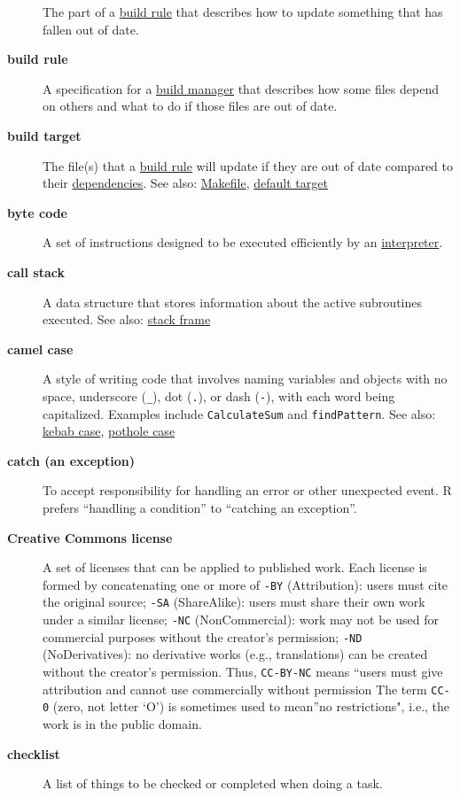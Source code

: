 \documentclass[
]{krantz}
\begin{document}
\begin{description}
The part of a \protect\hyperlink{build_rule}{build rule} that describes how to update something that has fallen out of date.
\item[\textbf{build rule}]
A specification for a \protect\hyperlink{build_manager}{build manager} that describes how some files depend on others and what to do if those files are out of date.
\item[\textbf{build target}]
The file(s) that a \protect\hyperlink{build_rule}{build rule} will update if they are out of date compared to their \protect\hyperlink{dependency}{dependencies}. See also: \protect\hyperlink{makefile}{Makefile}, \protect\hyperlink{default_target}{default target}
\item[\textbf{byte code}]
A set of instructions designed to be executed efficiently by an \protect\hyperlink{interpreter}{interpreter}.
\item[\textbf{call stack}]
A data structure that stores information about the active subroutines executed. See also: \protect\hyperlink{stack_frame}{stack frame}
\item[\textbf{camel case}]
A style of writing code that involves naming variables and objects with no space, underscore (\texttt{\_}), dot (\texttt{.}), or dash (\texttt{-}), with each word being capitalized. Examples include \texttt{CalculateSum} and \texttt{findPattern}. See also: \protect\hyperlink{kebab_case}{kebab case}, \protect\hyperlink{pothole_case}{pothole case}
\item[\textbf{catch (an exception)}]
To accept responsibility for handling an error or other unexpected event. R prefers ``handling a condition'' to ``catching an exception''.
\item[\textbf{Creative Commons license}]
A set of licenses that can be applied to published work. Each license is formed by concatenating one or more of \texttt{-BY} (Attribution): users must cite the original source; \texttt{-SA} (ShareAlike): users must share their own work under a similar license; \texttt{-NC} (NonCommercial): work may not be used for commercial purposes without the creator's permission; \texttt{-ND} (NoDerivatives): no derivative works (e.g., translations) can be created without the creator's permission. Thus, \texttt{CC-BY-NC} means ``users must give attribution and cannot use commercially without permission The term \texttt{CC-0} (zero, not letter `O') is sometimes used to mean''no restrictions", i.e., the work is in the public domain.
\item[\textbf{checklist}]
A list of things to be checked or completed when doing a task.

\end{description}
\end{document}
